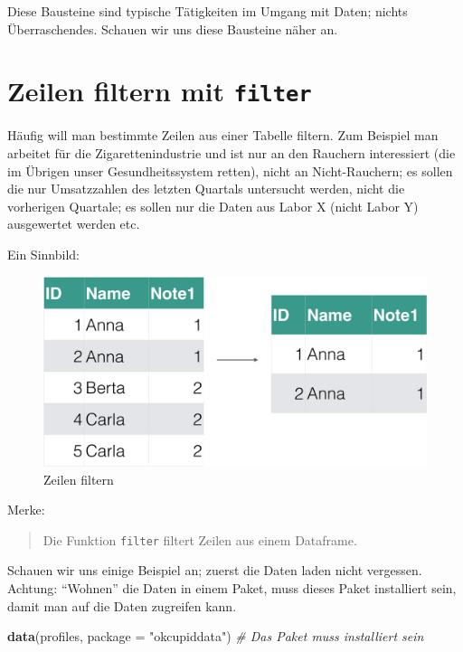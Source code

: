\documentclass[12pt,ngerman,paper=a4,pagesize,DIV=13]{scrreprt}
\newenvironment{Shaded}{\begin{snugshade}}{\end{snugshade}}
\newcommand{\CommentTok}[1]{\textcolor[rgb]{0.56,0.35,0.01}{\textit{#1}}}
\newcommand{\DataTypeTok}[1]{\textcolor[rgb]{0.13,0.29,0.53}{#1}}
\newcommand{\KeywordTok}[1]{\textcolor[rgb]{0.13,0.29,0.53}{\textbf{#1}}}
\newcommand{\NormalTok}[1]{#1}
\newcommand{\StringTok}[1]{\textcolor[rgb]{0.31,0.60,0.02}{#1}}
\begin{document}
Diese Bausteine sind typische Tätigkeiten im Umgang mit Daten; nichts
Überraschendes. Schauen wir uns diese Bausteine näher an.

\hypertarget{zeilen-filtern-mit-filter}{%
\section{\texorpdfstring{Zeilen filtern mit
\texttt{filter}}{Zeilen filtern mit filter}}\label{zeilen-filtern-mit-filter}}

Häufig will man bestimmte Zeilen aus einer Tabelle filtern. Zum Beispiel
man arbeitet für die Zigarettenindustrie und ist nur an den Rauchern
interessiert (die im Übrigen unser Gesundheitssystem retten), nicht an
Nicht-Rauchern; es sollen die nur Umsatzzahlen des letzten Quartals
untersucht werden, nicht die vorherigen Quartale; es sollen nur die
Daten aus Labor X (nicht Labor Y) ausgewertet werden etc.

Ein Sinnbild:

\begin{figure}

{\centering \includegraphics[width=0.6\linewidth]{Inhalte/images/Datenjudo/filter} 

}

\caption{Zeilen filtern}\label{fig:fig-filter}
\end{figure}

Merke:

\begin{quote}
Die Funktion \texttt{filter} filtert Zeilen aus einem Dataframe.
\end{quote}

Schauen wir uns einige Beispiel an; zuerst die Daten laden nicht
vergessen. Achtung: \enquote{Wohnen} die Daten in einem Paket, muss
dieses Paket installiert sein, damit man auf die Daten zugreifen kann.

\begin{Shaded}
\begin{Highlighting}[]
\KeywordTok{data}\NormalTok{(profiles, }\DataTypeTok{package =} \StringTok{"okcupiddata"}\NormalTok{)  }\CommentTok{# Das Paket muss installiert sein}
\end{Highlighting}
\end{Shaded}
\end{document}
